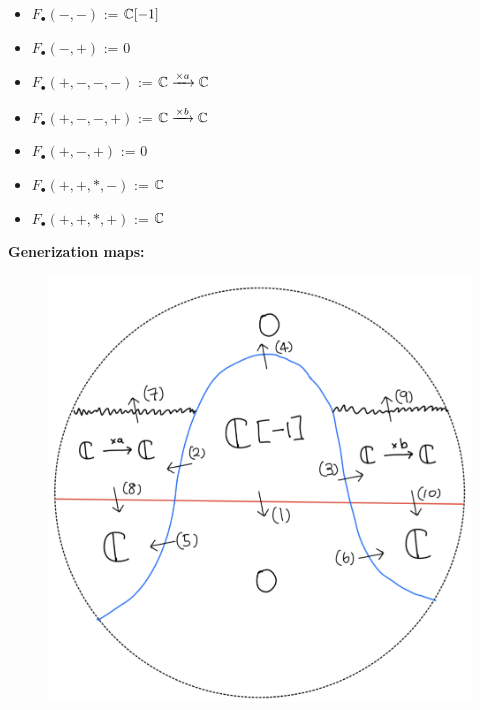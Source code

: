 \begin{itemize}
\item $F_\bullet(-,-)$ := $\mathbb{C}[-1]$
\item $F_\bullet(-,+)$ := $0$
\item $F_\bullet(+,-,-,-)$ := $\mathbb{C} \xrightarrow{\times a} \mathbb{C} $
\item $F_\bullet(+,-,-,+)$ := $\mathbb{C} \xrightarrow{\times b} \mathbb{C} $
\item $F_\bullet(+,-,+)$ := $0$
\item $F_\bullet(+,+,*,-)$ := $\mathbb{C}$
\item $F_\bullet(+,+,*,+)$ := $\mathbb{C}$
\end{itemize}

\textbf{Generization maps:}
\begin{figure}[H]
    \centering
    \includegraphics[scale = 0.95]{diagrams/lemma2/40.png} 
    \caption{}
    \label{fig:your-label}
\end{figure}
